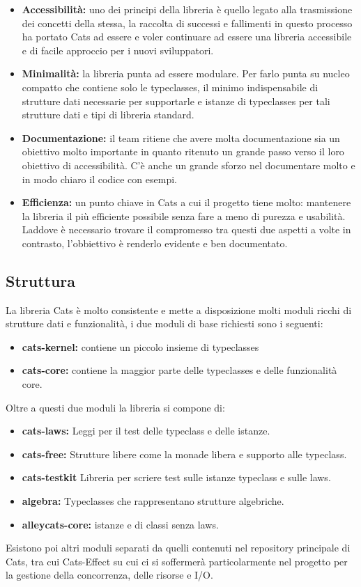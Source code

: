 \begin{itemize}
    \item  \textbf{Accessibilità:} uno dei principi della libreria è quello legato alla trasmissione dei concetti della stessa, la raccolta di successi e fallimenti in questo processo ha portato Cats ad essere e voler continuare ad essere una libreria accessibile e di facile approccio per i  nuovi sviluppatori.
    \item \textbf{Minimalità:} la libreria punta ad essere modulare. Per farlo punta su nucleo compatto che contiene solo le typeclasses, il minimo indispensabile di strutture dati necessarie per supportarle e istanze di typeclasses per tali strutture dati e tipi di libreria standard.
    \item \textbf{Documentazione:} il team ritiene che avere molta documentazione sia un obiettivo molto importante in quanto ritenuto un grande passo verso il loro obiettivo di accessibilità. C'è anche un grande sforzo nel documentare molto e in modo chiaro il codice con esempi.
    \item \textbf{Efficienza:} un punto chiave in Cats a cui il progetto tiene molto: mantenere la libreria il più efficiente possibile senza fare a meno di purezza e usabilità. Laddove è necessario trovare il compromesso tra questi due aspetti a volte in contrasto, l'obbiettivo è renderlo evidente e ben documentato.
    
\end{itemize}

\subsection{Struttura}
La libreria Cats è molto consistente e mette a disposizione molti moduli ricchi di strutture dati e funzionalità, i due moduli di base richiesti sono i seguenti:
\begin{itemize}
    \item \textbf{cats-kernel:} contiene un piccolo insieme di typeclasses
    \item  \textbf{cats-core:} contiene la maggior parte delle typeclasses e delle funzionalità core.
\end{itemize}

Oltre a questi due moduli la libreria si compone di: 
\begin{itemize}
    \item \textbf{cats-laws:} Leggi per il test delle typeclass e delle istanze.
    \item \textbf{cats-free:} Strutture libere come la monade libera e supporto alle typeclass.
    \item \textbf{cats-testkit} Libreria per scriere test sulle istanze typeclass  e sulle laws.
    \item \textbf{algebra:} Typeclasses che rappresentano strutture algebriche.
    \item \textbf{alleycats-core:} istanze e di classi senza laws.
\end{itemize}

\noindent Esistono poi altri moduli separati da quelli contenuti nel repository principale di Cats, tra cui Cats-Effect su cui ci si soffermerà particolarmente nel progetto per la gestione della concorrenza, delle risorse e I/O.



